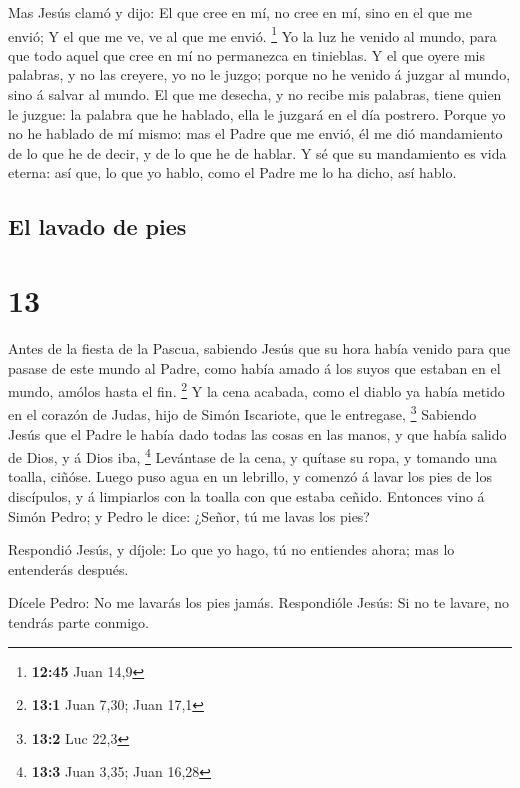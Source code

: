  Mas Jesús clamó y dijo: El que cree en mí, no cree en
mí, sino en el que me envió;  Y el que me ve, ve al que
me envió. \footnote{\textbf{12:45} Juan 14,9}  Yo la luz
he venido al mundo, para que todo aquel que cree en mí no permanezca en
tinieblas.  Y el que oyere mis palabras, y no las
creyere, yo no le juzgo; porque no he venido á juzgar al mundo, sino á
salvar al mundo.  El que me desecha, y no recibe mis
palabras, tiene quien le juzgue: la palabra que he hablado, ella le
juzgará en el día postrero.  Porque yo no he hablado de
mí mismo: mas el Padre que me envió, él me dió mandamiento de lo que he
de decir, y de lo que he de hablar.  Y sé que su
mandamiento es vida eterna: así que, lo que yo hablo, como el Padre me
lo ha dicho, así hablo.

\hypertarget{el-lavado-de-pies}{%
\subsection{El lavado de pies}\label{el-lavado-de-pies}}

\hypertarget{section-12}{%
\section{13}\label{section-12}}

 Antes de la fiesta de la Pascua, sabiendo Jesús que su
hora había venido para que pasase de este mundo al Padre, como había
amado á los suyos que estaban en el mundo, amólos hasta el fin.
\footnote{\textbf{13:1} Juan 7,30; Juan 17,1}  Y la cena
acabada, como el diablo ya había metido en el corazón de Judas, hijo de
Simón Iscariote, que le entregase, \footnote{\textbf{13:2} Luc 22,3}
 Sabiendo Jesús que el Padre le había dado todas las cosas
en las manos, y que había salido de Dios, y á Dios iba, \footnote{\textbf{13:3}
  Juan 3,35; Juan 16,28}  Levántase de la cena, y quítase
su ropa, y tomando una toalla, ciñóse.  Luego puso agua en
un lebrillo, y comenzó á lavar los pies de los discípulos, y á
limpiarlos con la toalla con que estaba ceñido.  Entonces
vino á Simón Pedro; y Pedro le dice: ¿Señor, tú me lavas los pies?

 Respondió Jesús, y díjole: Lo que yo hago, tú no
entiendes ahora; mas lo entenderás después.

 Dícele Pedro: No me lavarás los pies jamás. Respondióle
Jesús: Si no te lavare, no tendrás parte conmigo.

